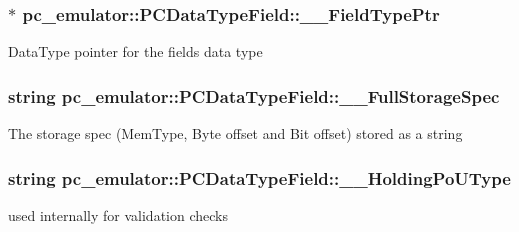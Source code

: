 \subsubsection[{\texorpdfstring{\+\_\+\+\_\+\+Field\+Type\+Ptr}{__FieldTypePtr}}]{$\ast$ pc\+\_\+emulator\+::\+P\+C\+Data\+Type\+Field\+::\+\_\+\+\_\+\+Field\+Type\+Ptr}\hypertarget{classpc__emulator_1_1PCDataTypeField_ad64e3eb1b17c2f695f50e7a1fbc95b26}{}\label{classpc__emulator_1_1PCDataTypeField_ad64e3eb1b17c2f695f50e7a1fbc95b26}
Data\+Type pointer for the field\textquotesingle{}s data type 
\subsubsection[{\texorpdfstring{\+\_\+\+\_\+\+Full\+Storage\+Spec}{__FullStorageSpec}}]{\setlength{\rightskip}{0pt plus 5cm}string pc\+\_\+emulator\+::\+P\+C\+Data\+Type\+Field\+::\+\_\+\+\_\+\+Full\+Storage\+Spec}\hypertarget{classpc__emulator_1_1PCDataTypeField_a5817d10cfd121f7ba988c855ae9ec0fe}{}\label{classpc__emulator_1_1PCDataTypeField_a5817d10cfd121f7ba988c855ae9ec0fe}
The storage spec (Mem\+Type, Byte offset and Bit offset) stored as a string 
\subsubsection[{\texorpdfstring{\+\_\+\+\_\+\+Holding\+Po\+U\+Type}{__HoldingPoUType}}]{\setlength{\rightskip}{0pt plus 5cm}string pc\+\_\+emulator\+::\+P\+C\+Data\+Type\+Field\+::\+\_\+\+\_\+\+Holding\+Po\+U\+Type}\hypertarget{classpc__emulator_1_1PCDataTypeField_a8cd4b224ca8d346eb32e5d7c89d59630}{}\label{classpc__emulator_1_1PCDataTypeField_a8cd4b224ca8d346eb32e5d7c89d59630}
used internally for validation checks 
